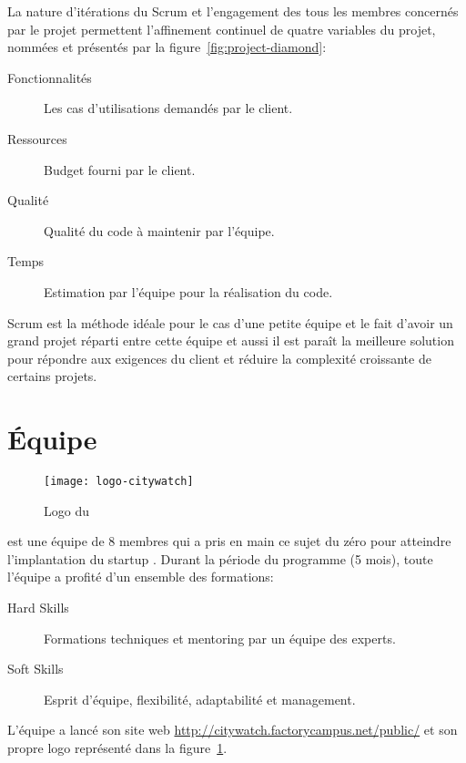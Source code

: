 La nature d'itérations du Scrum et l'engagement des tous les membres concernés
par le projet permettent l'affinement continuel de quatre variables du
projet, nommées  et présentés par la
figure~\ref{fig:project-diamond}:

\begin{description}
    \item [Fonctionnalités] Les cas d'utilisations demandés par le client.
    \item [Ressources] Budget fourni par le client.
    \item [Qualité] Qualité du code à maintenir par l'équipe.
    \item [Temps] Estimation par l'équipe pour la réalisation du code.
\end{description}



Scrum est la méthode idéale pour le cas d'une petite équipe et le fait d'avoir
un grand projet réparti entre cette équipe et aussi il est paraît la meilleure
solution pour répondre aux exigences du client et réduire la complexité
croissante de certains projets.

\section{Équipe }

\begin{figure}[!h]
    \centering
    \texttt{[image: logo-citywatch]}
    \caption{Logo du }
\label{fig:logo-citywatch}
\end{figure}

 est une équipe de 8 membres qui a pris en main ce sujet
du zéro pour atteindre l'implantation du startup .
Durant la période du programme (5 mois), toute l'équipe a profité d'un ensemble
des formations:

\begin{description}
 \item [Hard Skills] Formations techniques et mentoring par un équipe des
     experts.
 \item [Soft Skills] Esprit d'équipe, flexibilité, adaptabilité et management.
\end{description}

L'équipe a lancé son site web \url{http://citywatch.factorycampus.net/public/}
et son propre logo représenté dans la figure~\ref{fig:logo-citywatch}.

